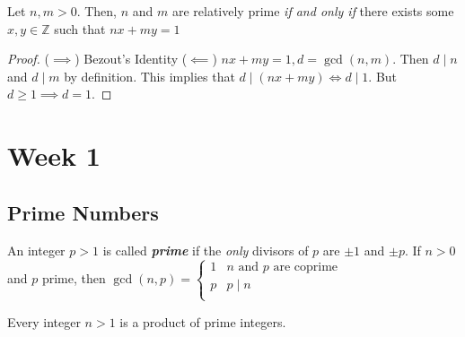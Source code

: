 \documentclass{report}
\newcommand{\Z}{\mathbb{Z}}
\newcommand{\textib}[1]{\textit{\textbf{{#1}}}}
\newcommand{\proposition}[1]{\begin{tcolorbox}[title=\textit{Proposition}]{#1}\end{tcolorbox}}
\newcommand{\corollary}[1]{\begin{tcolorbox}[title=\textit{Corollary}]{#1}\end{tcolorbox}}
\begin{document}
\corollary{
    Let $n, m > 0$. Then, $n$ and $m$ are relatively prime \textit{if and only if} there exists
    some $x, y \in \Z$ such that $nx + my = 1$
}
\begin{proof}
    ($\implies$) Bezout's Identity
    \newline
    \newline
    ($\impliedby$) $nx + my = 1, d = \gcd(n, m)$. Then $d \mid n$ and $d \mid m$ by definition.
    This implies that $d \mid (nx + my) \iff d \mid 1$. But $d \geq 1 \implies d = 1$.
\end{proof}


\chapter{Week 1}
\section{Prime Numbers}
An integer $p > 1$ is called \textib{prime} if the \textit{only} divisors of $p$ are $\pm 1$ and $\pm p$.
If $n > 0$ and $p$ prime, then $\gcd(n, p) = 
\begin{cases} 
    1 & n \text{ and } p \text{ are coprime} \\
    p & p \mid n \\
\end{cases}$

\proposition {
    Every integer $n > 1$ is a product of prime integers.
}
\end{document}
